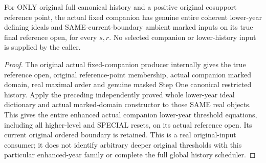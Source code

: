 \begin{theorem}
\label{hir:original-full-positive-companion-coherent-lower-history-year-consumer}
\leanok
{}
For ONLY original full canonical history and a positive original cosupport
reference point, the actual fixed companion has genuine entire coherent
lower-year defining ideals and SAME-current-boundary ambient marked inputs
on its true final reference open, for every $s,r$. No selected companion or
lower-history input is supplied by the caller.
\end{theorem}
\begin{proof}
The original actual fixed-companion producer internally gives the true reference
open, original reference-point membership, actual companion marked domain,
real maximal order and genuine masked Step One canonical restricted history.
Apply the preceding independently proved whole lower-year ideal dictionary and
actual marked-domain constructor to those SAME real objects. This gives the
entire enhanced actual companion lower-year threshold equations, including all
higher-level and SPECIAL resets, on its actual reference open. Its current
original ordered boundary is retained. This is a real original-input consumer;
it does not identify arbitrary deeper original thresholds with this particular
enhanced-year family or complete the full global history scheduler.
\end{proof}
